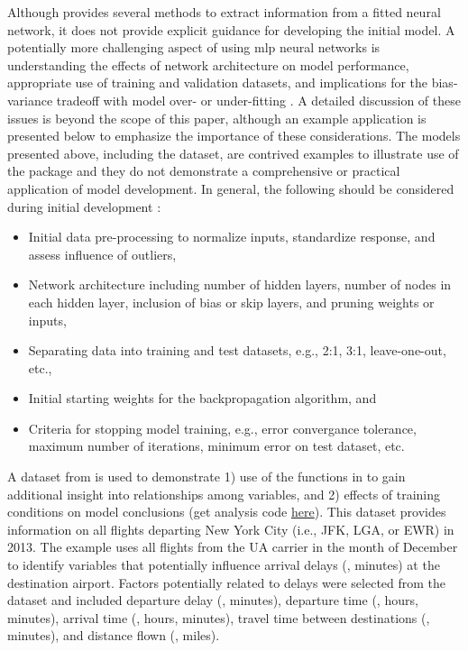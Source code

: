 \documentclass[article,shortnames]{jss}
\begin{document}
Although  provides several methods to extract information from a fitted neural network, it does not provide explicit guidance for developing the initial model.  A potentially more challenging aspect of using \ac{mlp} neural networks is understanding the effects of network architecture on model performance, appropriate use of training and validation datasets, and implications for the bias-variance tradeoff with model over- or under-fitting \citep{Maier00}.  A detailed discussion of these issues is beyond the scope of this paper, although an example application is presented below to emphasize the importance of these considerations.  The models presented above, including the  dataset, are contrived examples to illustrate use of the  package and they do not demonstrate a comprehensive or practical application of model development.  In general, the following should be considered during initial development \citep{Ripley96, Lek00, Maier00}:
\begin{itemize}
\item Initial data pre-processing to normalize inputs, standardize response, and assess influence of outliers,
\item Network architecture including number of hidden layers, number of nodes in each hidden layer, inclusion of bias or skip layers, and pruning weights or inputs,
\item Separating data into training and test datasets, e.g., 2:1, 3:1, leave-one-out, etc., 
\item Initial starting weights for the backpropagation algorithm, and
\item Criteria for stopping model training, e.g., error convergance tolerance, maximum number of iterations, minimum error on test dataset, etc.
\end{itemize}

A dataset from  \citep{Wickham14b} is used to demonstrate 1) use of the functions in  to gain additional insight into relationships among variables, and 2) effects of training conditions on model conclusions (get analysis code \href{https://raw.githubusercontent.com/fawda123/nnt_manu/master/flightimp.R}{here}).  This dataset provides information on all flights departing New York City (i.e., JFK, LGA, or EWR) in 2013.  The example uses all flights from the UA carrier in the month of December to identify variables that potentially influence arrival delays (, minutes) at the destination airport.  Factors potentially related to delays were selected from the dataset and included departure delay (, minutes), departure time (, hours, minutes), arrival time (, hours, minutes), travel time between destinations (, minutes), and distance flown (, miles).  
\end{document}
